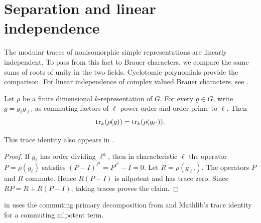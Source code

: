 \section{Separation and linear independence}
\label{lib:brauer:traces}

The modular traces of nonisomorphic simple representations are linearly
independent. To pass from this fact to Brauer characters, we compare the
same sums of roots of unity in the two fields. Cyclotomic polynomials
provide the comparison. For linear independence of complex valued Brauer
characters, see \cite[Theorem~2.6]{Navarro1998}.

\begin{lemma}
\label{lib:brauer:regular-traces}
Let $\rho$ be a finite dimensional $k$-representation of $G$.
For every $g\in G$, write $g=g_\ell g_{\ell'}$ as commuting factors of
$\ell$-power order and order prime to $\ell$. Then
\[
 \operatorname{tr}_k(\rho(g))=\operatorname{tr}_k(\rho(g_{\ell'})).
\]
\end{lemma}
This trace identity also appears in \cite[Lemma~2.4]{Navarro1998}.
\begin{proof}
If $g_\ell$ has order dividing $\ell^a$, then in characteristic $\ell$
the operator $P=\rho(g_\ell)$ satisfies
$(P-I)^{\ell^a}=P^{\ell^a}-I=0$. Let $R=\rho(g_{\ell'})$.
The operators $P$ and $R$ commute. Hence $R(P-I)$ is nilpotent and has
trace zero. Since $RP=R+R(P-I)$, taking traces proves the claim.
\end{proof}

\begin{implementation}
 in
 uses the commuting primary
decomposition from  and Mathlib's trace
identity for a commuting nilpotent term.
\end{implementation}

